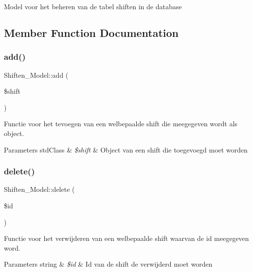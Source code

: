 Model voor het beheren van de tabel shiften in de database 

\subsection{Member Function Documentation}
\mbox{\label{class_shiften___model_ae95a20c13c92700b673c4b850a084b85}} 
\subsubsection{\texorpdfstring{add()}{add()}}
{\footnotesize\ttfamily Shiften\+\_\+\+Model\+::add (\begin{DoxyParamCaption}\item[{}]{\$shift }\end{DoxyParamCaption})}

Functie voor het tevoegen van een welbepaalde shift die meegegeven wordt als object. 
\begin{DoxyParams}[1]{Parameters}
std\+Class & {\em \$shift} & Object van een shift die toegevoegd moet worden \\
\hline
\end{DoxyParams}
\mbox{\label{class_shiften___model_aa8ebb0f37babc9dbfc4c026f0a73d6e6}} 
\subsubsection{\texorpdfstring{delete()}{delete()}}
{\footnotesize\ttfamily Shiften\+\_\+\+Model\+::delete (\begin{DoxyParamCaption}\item[{}]{\$id }\end{DoxyParamCaption})}

Functie voor het verwijderen van een welbepaalde shift waarvan de id meegegeven word. 
\begin{DoxyParams}[1]{Parameters}
string & {\em \$id} & Id van de shift de verwijderd moet worden \\
\hline
\end{DoxyParams}
\mbox{\label{class_shiften___model_a0e222557a11630559c7eaa6ca29c55a6}} 
